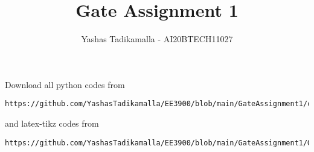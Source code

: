 \documentclass[journal,12pt,twocolumn]{IEEEtran}
\DeclareMathOperator*{\Res}{Res}
\begin{document}
\newcommand{\BEQA}{\begin{eqnarray}}
\newcommand{\EEQA}{\end{eqnarray}}
\newcommand{\define}{\stackrel{\triangle}{=}}

\raggedbottom
\setlength{\parindent}{0pt}
\providecommand{\mbf}{\mathbf}
\providecommand{\pr}[1]{\ensuremath{\Pr\left(#1\right)}}
\providecommand{\qfunc}[1]{\ensuremath{Q\left(#1\right)}}
\providecommand{\sbrak}[1]{\ensuremath{{}\left[#1\right]}}
\providecommand{\lsbrak}[1]{\ensuremath{{}\left[#1\right.}}
\providecommand{\rsbrak}[1]{\ensuremath{{}\left.#1\right]}}
\providecommand{\brak}[1]{\ensuremath{\left(#1\right)}}
\providecommand{\lbrak}[1]{\ensuremath{\left(#1\right.}}
\providecommand{\rbrak}[1]{\ensuremath{\left.#1\right)}}
\providecommand{\cbrak}[1]{\ensuremath{\left\{#1\right\}}}
\providecommand{\lcbrak}[1]{\ensuremath{\left\{#1\right.}}
\providecommand{\rcbrak}[1]{\ensuremath{\left.#1\right\}}}
\theoremstyle{remark}
\newtheorem{rem}{Remark}
\newtheorem*{remark}{Remark}
\newcommand{\sgn}{\mathop{\mathrm{sgn}}}
\providecommand{\abs}[1]{\vert#1\vert}
\providecommand{\res}[1]{\Res\displaylimits_{#1}} 
\providecommand{\norm}[1]{\lVert#1\rVert}
\providecommand{\mtx}[1]{\mathbf{#1}}
\providecommand{\mean}[1]{E[ #1 ]}
\providecommand{\fourier}{\overset{\mathcal{F}}{ \rightleftharpoons}}
\providecommand{\system}{\overset{\mathcal{H}}{ \longleftrightarrow}}
\newcommand{\solution}{\noindent \textbf{Solution: }}
\newcommand{\cosec}{\,\text{cosec}\,}
\providecommand{\dec}[2]{\ensuremath{\overset{#1}{\underset{#2}{\gtrless}}}}
\newcommand{\myvec}[1]{\ensuremath{\begin{pmatrix}#1\end{pmatrix}}}
\newcommand{\mydet}[1]{\ensuremath{\begin{vmatrix}#1\end{vmatrix}}}
\makeatletter
{}
\makeatother
\let\StandardTheFigure\thefigure
\let\vec\mathbf
\renewcommand{\thefigure}{\theproblem}
\def\putbox#1#2#3{\makebox[0in][l]{\makebox[#1][l]{}\raisebox{\baselineskip}[0in][0in]{\raisebox{#2}[0in][0in]{#3}}}}
     \def\rightbox#1{\makebox[0in][r]{#1}}
     \def\centbox#1{\makebox[0in]{#1}}
     \def\topbox#1{\raisebox{-\baselineskip}[0in][0in]{#1}}
     \def\midbox#1{\raisebox{-0.5\baselineskip}[0in][0in]{#1}}
\vspace{3cm}
\title{Gate Assignment 1}
\author{Yashas Tadikamalla - AI20BTECH11027}
\maketitle
\newpage
\bigskip
\renewcommand{\thefigure}{\theenumi}
\renewcommand{\thetable}{\theenumi}
Download all python codes from 
\begin{lstlisting}
https://github.com/YashasTadikamalla/EE3900/blob/main/GateAssignment1/codes
\end{lstlisting}
%
and latex-tikz codes from 
%
\begin{lstlisting}
https://github.com/YashasTadikamalla/EE3900/blob/main/GateAssignment1/GateAssignment1.tex
\end{lstlisting}
\end{document}
